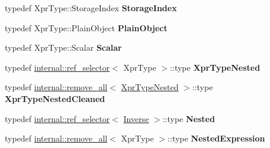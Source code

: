 \begin{DoxyCompactItemize}
typedef Xpr\+Type\+::\+Storage\+Index {\bfseries Storage\+Index}
\item 
\mbox{\label{class_eigen_1_1_inverse_a43944177f0ff3b1674204d5ee7e9ccb3}} 
typedef Xpr\+Type\+::\+Plain\+Object {\bfseries Plain\+Object}
\item 
\mbox{\label{class_eigen_1_1_inverse_aec6048fd8cc031a99b0f458841b3811f}} 
typedef Xpr\+Type\+::\+Scalar {\bfseries Scalar}
\item 
\mbox{\label{class_eigen_1_1_inverse_a0c69f9e9bc52018fe6a3dec47d363066}} 
typedef \hyperlink{struct_eigen_1_1internal_1_1ref__selector}{internal\+::ref\+\_\+selector}$<$ Xpr\+Type $>$\+::type {\bfseries Xpr\+Type\+Nested}
\item 
\mbox{\label{class_eigen_1_1_inverse_a9785bc56c3c90a9435d6248d2706b17c}} 
typedef \hyperlink{struct_eigen_1_1internal_1_1remove__all}{internal\+::remove\+\_\+all}$<$ \hyperlink{class_eigen_1_1internal_1_1_tensor_lazy_evaluator_writable}{Xpr\+Type\+Nested} $>$\+::type {\bfseries Xpr\+Type\+Nested\+Cleaned}
\item 
\mbox{\label{class_eigen_1_1_inverse_a47767cc8b6793334f19aa67834191bc5}} 
typedef \hyperlink{struct_eigen_1_1internal_1_1ref__selector}{internal\+::ref\+\_\+selector}$<$ \hyperlink{class_eigen_1_1_inverse}{Inverse} $>$\+::type {\bfseries Nested}
\item 
\mbox{\label{class_eigen_1_1_inverse_a35e730de4de44f631213d25001e3edc3}} 
typedef \hyperlink{struct_eigen_1_1internal_1_1remove__all}{internal\+::remove\+\_\+all}$<$ Xpr\+Type $>$\+::type {\bfseries Nested\+Expression}
\end{DoxyCompactItemize}
